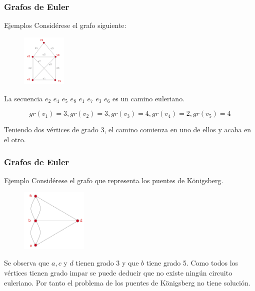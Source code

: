 \documentclass{beamer}
\begin{document}
\begin{frame}
\frametitle{Grafos de Euler}
\begin{block}{Ejemplos}
Consid\'erese el grafo siguiente:
\begin{figure}[h]
 \label{fig:volumen}
\centering
\includegraphics[height=2.5cm]{g10}
\end{figure}
La secuencia $e_2$ $e_4$ $e_5$ $e_8$ $e_1$ $e_7$ $e_3$ $e_6$ es un camino euleriano.

\[gr(v_1)=3,gr(v_2)=3,gr(v_3)=4,gr(v_4)=2,gr(v_5)=4\]

Teniendo dos v\'ertices de grado 3, el camino comienza en uno de ellos y acaba en el otro. 

\end{block}
\end{frame}







\begin{frame}
\frametitle{Grafos de Euler}
\begin{block}{Ejemplo}
Consid\'erese el grafo que representa los puentes de K\"onigsberg. 
\begin{figure}[h]
 \label{fig:volumen}
\centering
\includegraphics[height=3cm]{g11}
\end{figure}

Se observa que $a,c$ y $d$ tienen grado 3 y que $b$ tiene grado 5. Como todos los v\'ertices tienen grado impar se puede deducir que no existe ning\'un circuito euleriano. Por tanto el problema de los puentes de K\"onigsberg no tiene soluci\'on. 
\end{block}
\end{frame}
\end{document}
